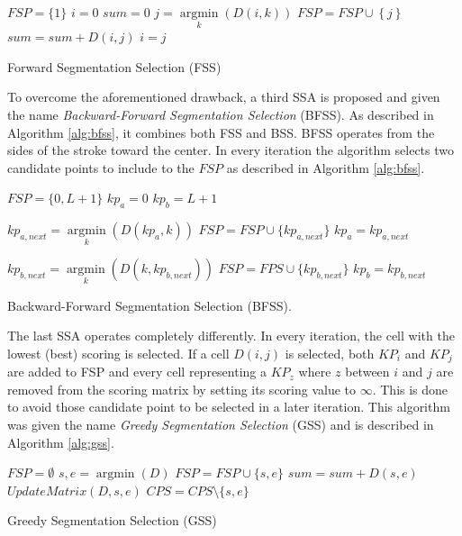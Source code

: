 \documentclass[10pt, conference, compsocconf]{IEEEtran}
\begin{document}
\begin{algorithm}
$FSP = \{1\} $\;
$i=0$\;
$sum=0$\;
{
	$j = \mathop {\arg \min }\limits_k \left( {D\left( {i,k} \right)} \right)$\;
	$FSP = FSP \cup \left\{ j \right\}$\;
	$sum = sum + D\left( {i,j} \right)$\;
	$i=j$\;
}
\caption{Forward Segmentation Selection (FSS)}
\label{alg:fss}
\end{algorithm}

To overcome the aforementioned drawback, a third SSA is proposed and given the name \emph{Backward-Forward Segmentation Selection} (BFSS). As described in Algorithm \ref{alg:bfss}, it combines both FSS and BSS. BFSS operates from the sides of the stroke toward the center. In every iteration the algorithm selects two candidate points to include to the $FSP$ as described in Algorithm \ref{alg:bfss}. \\

\begin{algorithm}
$FSP = \{0,L+1\}$\;
$kp_{a}=0$\;
$kp_{b}=L+1$\;
{
	$kp_{a,next} = \mathop {\arg \min}\limits_k (D(kp_a,k))$\;
	$FSP = FSP \cup \{kp_{a,next}\}$\;
	$kp_{a}=kp_{a,next}$\;
	
	$kp_{b,next} = \mathop {\arg \min}\limits_k (D(k,kp_{b,next}))$\;
	$FSP = FPS \cup \{kp_{b,next}\}$\;	
	$kp_{b}=kp_{b,next}$\;
}

\caption{Backward-Forward Segmentation Selection (BFSS).}
\label{alg:bfss}
\end{algorithm}
  
The last SSA operates completely differently. In every iteration, the cell with the lowest (best) scoring is selected. If a cell $D(i,j)$ is selected, both $KP_{i}$ and $KP_{j}$ are added to FSP and every cell representing a $KP_{z}$ where $z$ between $i$ and $j$ are removed from the scoring matrix by setting its scoring value to $\infty$. This is done to avoid those candidate point to be selected in a later iteration. This algorithm was given the name \emph{Greedy Segmentation Selection} (GSS) and is described in Algorithm \ref{alg:gss}.

\begin{algorithm}
$FSP=\emptyset$\;
{
	${s,e} = \mathop {\arg \min}(D)$\;
	$FSP = FSP \cup \{s,e\}$\;
	$sum = sum + D(s,e)$\;
	$UpdateMatrix(D,s,e)$\;
	$CPS = CPS\setminus\{s,e\}$\;
}

\caption{Greedy Segmentation Selection (GSS)}
\label{alg:gss}
\end{algorithm}
\end{document}
